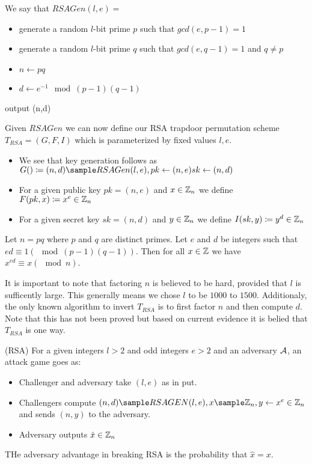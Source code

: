 We say that \(RSAGen(l, e) = \)
\begin{itemize}
    \item generate a random \(l\)-bit prime \(p\) such that \(gcd(e, p-1) = 1\) 
    \item generate a random \(l\)-bit prime \(q\) such that \(gcd(e, q-1) = 1 \) and \(q \neq p\)
    \item \( n \gets pq\)
    \item \( d \gets e^{-1} \mod (p-1)(q-1)\)
          
\end{itemize}
output (n,d)

Given \(RSAGen\) we can now define our RSA trapdoor permutation scheme \(T_{RSA} = (G,F,I)\) which is parameterized by fixed values \(l, e\). 

\begin{itemize}
\item We see that key generation follows as \(G() \coloneqq  (n,d) \sample RSAGen(l, e), pk \gets (n,e) sk \gets (n,d) \) 
\item For a given public key \(pk = (n,e)\) and \(x \in \mathbb{Z}_n\) we define \(F(pk, x ) \coloneqq x^e \in \mathbb{Z}_n\)
\item For a given secret key  \(sk = (n,d)\) and \(y \in \mathbb{Z}_n\) we define \(I(sk, y) \coloneqq  y^d \in \mathbb{Z}_n\)   
\end{itemize}


\begin{theorem}
    Let \(n=pq\) where \(p\) and \(q\) are distinct primes. Let \(e \) and \(d\) be integers such that \(ed \equiv 1 (\mod (p-1)(q-1))\). Then for all \(x \in \mathbb{Z}\) we have \(x^{ed} \equiv x (\mod n)\).        
\end{theorem}

It is important to note that factoring \(n\) is believed to be hard, provided that \(l\) is sufficently large. This generally means we chose \(l\) to be \(1000\) to \(1500\).  Additionaly, the only known algorithm to invert \(T_{RSA}\) is to first factor \(n\) and then compute \(d\). Note that this has not been proved but based on current evidence it is belied that \(T_{RSA}\) is one way.          

\begin{attackGame} (RSA)
    For a given integers \(l > 2\) and odd integers \(e > 2\) and an adversary \(\mathcal{A}\), an attack game goes as: 
    \begin{itemize}
        \item Challenger and adversary take \((l,e)\) as in put.
        \item Challengers compute \((n,d) \sample RSAGEN(l,e), x \sample \Z_n, y \gets x^e \in \Z_n\) and sends \((n,y)\) to the adversary. 
        \item Adversary outputs \(\hat{x} \in \mathbb{Z}_n\)     
    \end{itemize}
    THe adversary advantage in breaking RSA is the probability that \(\hat{x} = x\). 
\end{attackGame}

